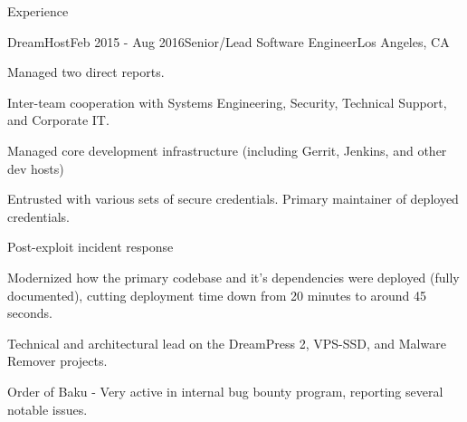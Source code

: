 \documentclass{resume} %
\begin{document}
\begin{rSection}{Experience}
\begin{rSubsection}{DreamHost}{Feb 2015 - Aug 2016}{Senior/Lead Software Engineer}{Los Angeles, CA}
\item Managed two direct reports.
\item Inter-team cooperation with Systems Engineering, Security, Technical Support, and Corporate IT.
\item Managed core development infrastructure (including Gerrit, Jenkins, and other dev hosts)
\item Entrusted with various sets of secure credentials. Primary maintainer of deployed credentials.
\item Post-exploit incident response
\item Modernized how the primary codebase and it's dependencies were deployed (fully documented), cutting deployment time down from 20 minutes to around 45 seconds.
\item Technical and architectural lead on the DreamPress 2, VPS-SSD, and Malware Remover projects.
\item Order of Baku - Very active in internal bug bounty program, reporting several notable issues.
\end{rSubsection}



\end{rSection}
\end{document}
